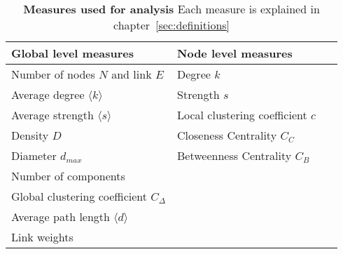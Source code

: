 \begin{table}
\small
\centering
\caption[Measures used for analysis]{\textbf{Measures used for analysis} Each measure is explained in chapter~\ref{sec:definitions}}
\vspace*{5mm}
\begin{tabularx}{\textwidth}{p{0.5\linewidth}p{0.5\linewidth}}
\toprule
\textbf{Global level measures} & \textbf{Node level measures}\\
\midrule
Number of nodes $N$ and link $E$ & Degree $k$ \\
Average degree $\langle k \rangle$ &  Strength $s$\\
Average strength $\langle s \rangle$ &   Local clustering coefficient $c$\\
Density $D$ & Closeness Centrality $C_C$ \\
Diameter $d_{max}$ & Betweenness Centrality $C_B$\\
Number of components & \\
Global clustering coefficient $C_{\Delta}$ &  \\
Average path length $\langle d \rangle$ & \\
Link weights & \\

\bottomrule
\end{tabularx}
\label{tab:netprop}
\end{table}

